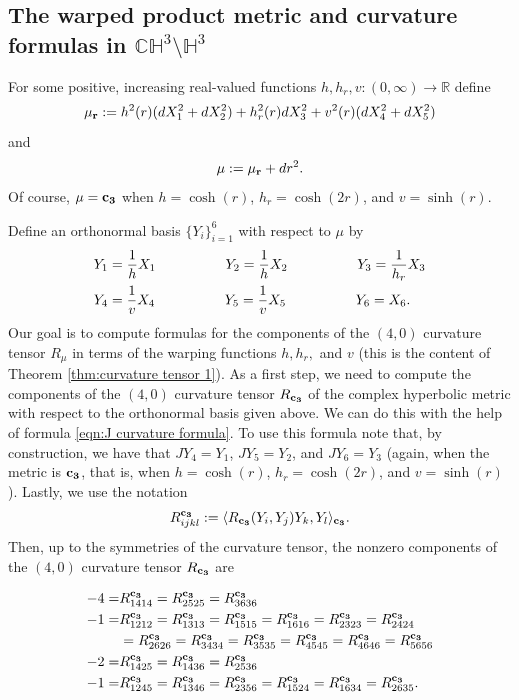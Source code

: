 \documentclass[10pt]{amsart}
\def\R{\mathbb{R}}
\def\la{\langle}
\def\ra{\rangle}
\def\H{\mathbb{H}}
\def\C{\mathbb{C}}
\theoremstyle{definition}
\theoremstyle{remark}
\numberwithin{equation}{section}
\begin{document}
\subsection{The warped product metric and curvature formulas in $\C \H^3 \setminus \H^3$}
For some positive, increasing real-valued functions $h, h_r, v : (0,\infty) \to \R$ define
	\begin{equation*}
	{\bf \mu_r} := h^2(r) (dX_1^2 + dX_2^2) + h_r^2(r) dX_3^2 + v^2(r) (dX_4^2 + dX_5^2)    
	\end{equation*}
and
	\begin{equation}\label{eqn:warped metric 2}
	{\bf \mu} := {\bf \mu_r} + dr^2.
	\end{equation}
Of course, ${\bf \mu} = {\bf c_3}$ when $h = \cosh(r)$, $h_r = \cosh(2r)$, and $v = \sinh(r)$.

Define an orthonormal basis $\{ Y_i \}_{i=1}^6$ with respect to $\mu$ by
	\begin{align}
	&Y_1 = \frac{1}{h} X_1	\hskip 50pt	Y_2 = \frac{1}{h} X_2	\hskip 50pt	Y_3 = \frac{1}{h_r} X_3  \label{eqn:orthonormal basis 1}  \\
	&Y_4 = \frac{1}{v} X_4	\hskip 50pt	Y_5 = \frac{1}{v} X_5		\hskip 50pt	Y_6 = X_6.  \nonumber
	\end{align}
Our goal is to compute formulas for the components of the $(4,0)$ curvature tensor $R_\mu$ in terms of the warping functions $h, h_r,$ and $v$ (this is the content of Theorem \ref{thm:curvature tensor 1}).  
As a first step, we need to compute the components of the $(4,0)$ curvature tensor $R_{\bf c_3}$ of the complex hyperbolic metric with respect to the orthonormal basis given above.  
We can do this with the help of formula \eqref{eqn:J curvature formula}.
To use this formula note that, by construction, we have that $JY_4 = Y_1$, $JY_5 = Y_2$, and $JY_6 = Y_3$ (again, when the metric is ${\bf c_3}$, that is, when $h = \cosh(r)$, $h_r = \cosh(2r)$, and $v = \sinh(r)$).
Lastly, we use the notation
	\begin{equation*}
	R^{\bf c_3}_{ijkl} := \la R_{\bf c_3}(Y_i,Y_j)Y_k, Y_l \ra_{\bf c_3}.
	\end{equation*}
Then, up to the symmetries of the curvature tensor, the nonzero components of the $(4,0)$ curvature tensor $R_{\bf c_3}$ are

	\begin{align}
	-4 = &R^{\bf c_3}_{1414} = R^{\bf c_3}_{2525} = R^{\bf c_3}_{3636}  \label{eqn:c3 tensor 1}  \\
	-1 = &R^{\bf c_3}_{1212} = R^{\bf c_3}_{1313} = R^{\bf c_3}_{1515} = R^{\bf c_3}_{1616} = R^{\bf c_3}_{2323} = R^{\bf c_3}_{2424}  \label{eqn:c3 tensor 2}  \\
	&= R^{\bf c_3}_{2626} = R^{\bf c_3}_{3434} = R^{\bf c_3}_{3535} = R^{\bf c_3}_{4545} = R^{\bf c_3}_{4646} = R^{\bf c_3}_{5656}  \nonumber  \\
	-2 = &R^{\bf c_3}_{1425} = R^{\bf c_3}_{1436} = R^{\bf c_3}_{2536}  \label{eqn:c3 tensor 3}  \\
	-1 = &R^{\bf c_3}_{1245} = R^{\bf c_3}_{1346} = R^{\bf c_3}_{2356}  = R^{\bf c_3}_{1524} = R^{\bf c_3}_{1634} = R^{\bf c_3}_{2635}.  \label{eqn:c3 tensor 4}
	\end{align}
	
\end{document}
